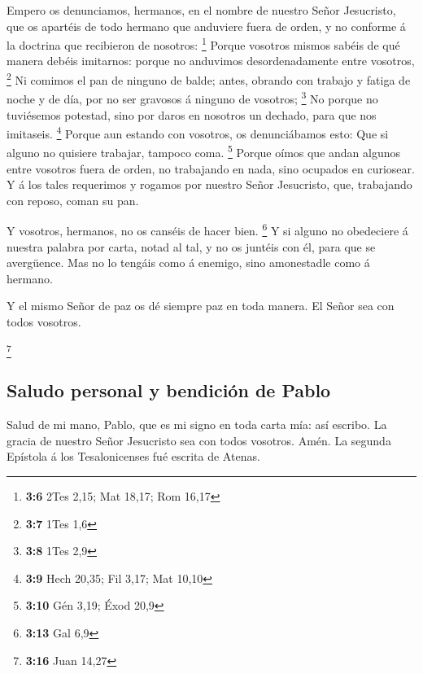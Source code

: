  Empero os denunciamos, hermanos, en el nombre de nuestro
Señor Jesucristo, que os apartéis de todo hermano que anduviere fuera de
orden, y no conforme á la doctrina que recibieron de nosotros:
\footnote{\textbf{3:6} 2Tes 2,15; Mat 18,17; Rom 16,17} 
Porque vosotros mismos sabéis de qué manera debéis imitarnos: porque no
anduvimos desordenadamente entre vosotros, \footnote{\textbf{3:7} 1Tes
  1,6}  Ni comimos el pan de ninguno de balde; antes,
obrando con trabajo y fatiga de noche y de día, por no ser gravosos á
ninguno de vosotros; \footnote{\textbf{3:8} 1Tes 2,9}  No
porque no tuviésemos potestad, sino por daros en nosotros un dechado,
para que nos imitaseis. \footnote{\textbf{3:9} Hech 20,35; Fil 3,17; Mat
  10,10}  Porque aun estando con vosotros, os
denunciábamos esto: Que si alguno no quisiere trabajar, tampoco coma.
\footnote{\textbf{3:10} Gén 3,19; Éxod 20,9}  Porque
oímos que andan algunos entre vosotros fuera de orden, no trabajando en
nada, sino ocupados en curiosear.  Y á los tales
requerimos y rogamos por nuestro Señor Jesucristo, que, trabajando con
reposo, coman su pan.

 Y vosotros, hermanos, no os canséis de hacer bien.
\footnote{\textbf{3:13} Gal 6,9}  Y si alguno no
obedeciere á nuestra palabra por carta, notad al tal, y no os juntéis
con él, para que se avergüence.  Mas no lo tengáis como á
enemigo, sino amonestadle como á hermano.

 Y el mismo Señor de paz os dé siempre paz en toda
manera. El Señor sea con todos vosotros.

\footnote{\textbf{3:16} Juan 14,27}

\hypertarget{saludo-personal-y-bendiciuxf3n-de-pablo}{%
\subsection{Saludo personal y bendición de
Pablo}\label{saludo-personal-y-bendiciuxf3n-de-pablo}}

 Salud de mi mano, Pablo, que es mi signo en toda carta
mía: así escribo.  La gracia de nuestro Señor Jesucristo
sea con todos vosotros. Amén. La segunda Epístola á los Tesalonicenses
fué escrita de Atenas.
